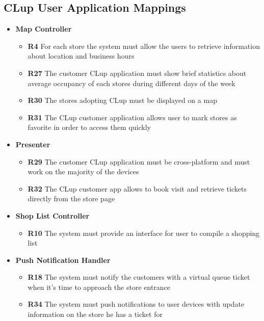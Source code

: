 \subsection{CLup User Application Mappings}
\begin{itemize}
    \item \colorbox{clup_blue0}{\textbf{Map Controller}}
          \begin{itemize}
              \item \textbf{R4} For each store the system must allow the users to retrieve information about location and business hours
              \item \textbf{R27} The customer CLup application must show brief statistics about average occupancy of each stores during different days of the week
              \item \textbf{R30} The stores adopting CLup must be displayed on a map
              \item \textbf{R31} The CLup customer application allows user to mark stores as favorite in order to access them quickly
          \end{itemize}
    \item \colorbox{clup_blue0}{\textbf{Presenter}}
          \begin{itemize}
              \item \textbf{R29} The customer CLup application must be cross-platform and must work on the majority of the devices
              \item \textbf{R32} The CLup customer app allows to book visit and retrieve tickets directly from the store page
          \end{itemize}
    \item \colorbox{clup_blue0}{\textbf{Shop List Controller}}
          \begin{itemize}
              \item \textbf{R10} The system must provide an interface for user to compile a shopping list
          \end{itemize}
    \item \colorbox{clup_blue0}{\textbf{Push Notification Handler}}
          \begin{itemize}
              \item \textbf{R18} The system must notify the customers with a virtual queue ticket when it’s time to approach the store entrance
              \item \textbf{R34} The system must push notifications to user devices with update information on the store he has a ticket for

\end{itemize}
\end{itemize}
